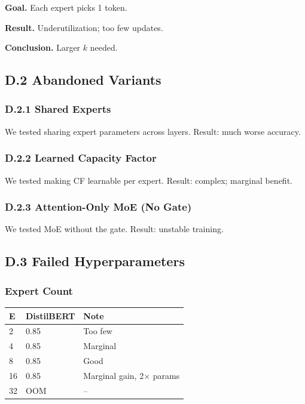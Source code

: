 \textbf{Goal.} Each expert picks 1 token.

\textbf{Result.} Underutilization; too few updates.

\textbf{Conclusion.} Larger $k$ needed.

\subsection{D.2 Abandoned Variants}

\subsubsection{D.2.1 Shared Experts}

We tested sharing expert parameters across layers. Result: much worse 
accuracy.

\subsubsection{D.2.2 Learned Capacity Factor}

We tested making CF learnable per expert. Result: complex; marginal 
benefit.

\subsubsection{D.2.3 Attention-Only MoE (No Gate)}

We tested MoE without the gate. Result: unstable training.

\subsection{D.3 Failed Hyperparameters}

\subsubsection{Expert Count}

\begin{table}[H]
\centering
\small
\begin{tabular}{lll}
\toprule
\textbf{E} & \textbf{DistilBERT} & \textbf{Note} \\
\midrule
2 & 0.85 & Too few \\
4 & 0.85 & Marginal \\
8 & 0.85 & Good \\
16 & 0.85 & Marginal gain, 2$\times$ params \\
32 & OOM & -- \\
\bottomrule
\end{tabular}
\end{table}

